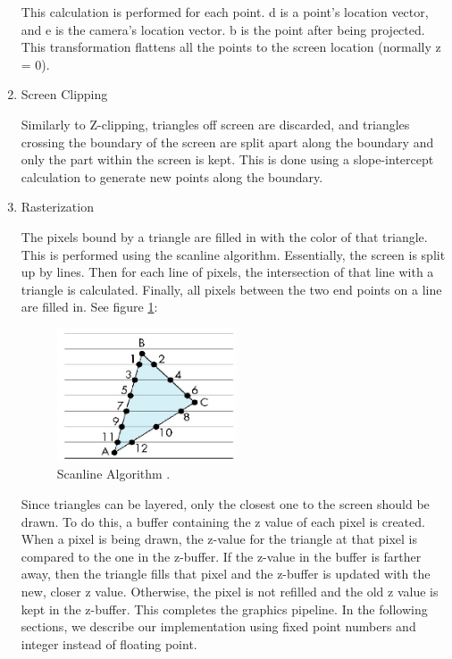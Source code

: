 \documentclass[onecolumn]{IEEEtran}
\begin{document}
\begin{enumerate}
This calculation is performed for each point.  d is a point’s location vector, and e is the camera’s location vector.  b is the point after being projected.  This transformation flattens all the points to the screen location (normally z = 0).
\item Screen Clipping

Similarly to Z-clipping, triangles off screen are discarded, and triangles crossing the boundary of the screen are split apart along the boundary and only the part within the screen is kept.  This is done using a slope-intercept calculation to generate new points along the boundary.

\item Rasterization

The pixels bound by a triangle are filled in with the color of that triangle.  This is performed using the scanline algorithm.  Essentially, the screen is split up by lines.  Then for each line of pixels, the intersection of that line with a triangle is calculated.  Finally, all pixels between the two end points on a line are filled in.  See figure \ref{fig:rasterization}:

\begin{figure}[H]
	\centering
	\includegraphics[width=0.50\textwidth]{rasterization.png}
	\caption{Scanline Algorithm \cite{rasterizer}.}
	\label{fig:rasterization}
\end{figure}


Since triangles can be layered, only the closest one to the screen should be drawn.  To do this, a buffer containing the z value of each pixel is created.  When a pixel is being drawn, the z-value for the triangle at that pixel is compared to the one in the z-buffer.  If the z-value in the buffer is farther away, then the triangle fills that pixel and the z-buffer is updated with the new, closer z value.  Otherwise, the pixel is not refilled and the old z value is kept in the z-buffer.  This completes the graphics pipeline.  In the following sections, we describe our implementation using fixed point numbers and integer instead of floating point.

\end{enumerate}
\end{document}
